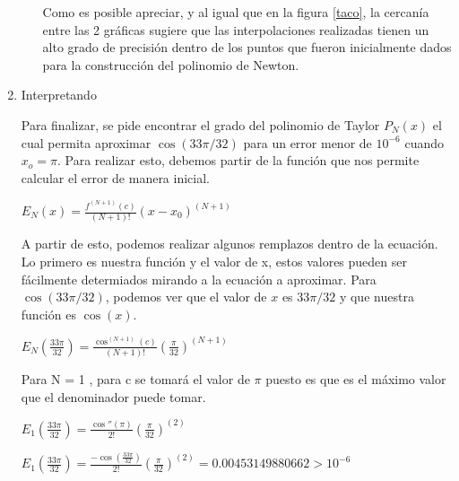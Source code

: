 \documentclass[english,notitlepage,letterpaper, 10pt]{article} %
\begin{document}
\begin{enumerate}
\begin{enumerate}
      Como es posible apreciar, y al igual que en la figura \ref{taco}, la cercanía entre las 2 gráficas sugiere que las interpolaciones realizadas tienen un alto grado de precisión dentro de los puntos que fueron inicialmente dados para la construcción del polinomio de Newton.
    \end{enumerate}

    \item Interpretando
    
    Para finalizar, se pide encontrar el grado del polinomio de Taylor $P_N(x)$ el cual permita aproximar $\cos(33 \pi / 32)$ para un error menor de $10^{-6}$ cuando $x_o = \pi$. Para realizar esto, debemos partir de la función que nos permite calcular el error de manera inicial. 

    \begin{center}
      \begin{math}
        E_N(x) = \displaystyle \frac{f^{(N+1)}(c)}{(N+1)!} (x-x_0)^{(N+1)}
      \end{math}
    \end{center}

    A partir de esto, podemos realizar algunos remplazos dentro de la ecuación. Lo primero es nuestra función y el valor de x, estos valores pueden ser fácilmente determiados mirando a la ecuación a aproximar. Para $\cos (33 \pi / 32)$, podemos ver que el valor de $x$ es $33 \pi /32$ y que nuestra función es $\cos(x)$. 

    \begin{center}
      \begin{math}
        E_N(\frac{33 \pi}{32}) = \displaystyle \frac{\cos^{(N+1)}(c)}{(N+1)!} \textstyle (\frac{ \pi}{32})^{(N+1)}
      \end{math}
    \end{center}

    Para N = 1 , para c se tomará el valor de $\pi$ puesto es que es el máximo valor que el denominador puede tomar. 

    \begin{center}
      \begin{math}
        E_1(\frac{33 \pi}{32}) = \displaystyle \frac{\cos''(\pi)}{2!} \textstyle (\frac{ \pi}{32})^{(2)}
      \end{math}

      \begin{math}
        E_1(\frac{33 \pi}{32}) = \displaystyle \frac{-\cos(\frac{33 \pi}{32})}{2!} \textstyle (\frac{ \pi}{32})^{(2)} = 0.00453149880662 > 10^{-6}
      \end{math}
    \end{center}


\end{enumerate}
\end{document}
